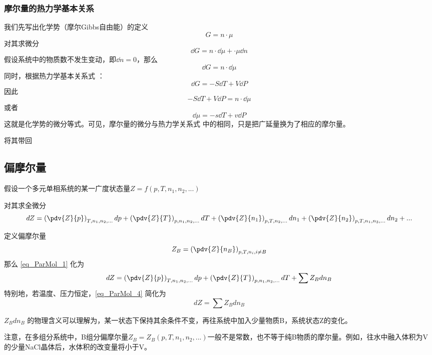 \subsubsection{摩尔量的热力学基本关系}
我们先写出化学势（摩尔Gibbs自由能）的定义
$$G = n \cdot \mu$$
对其求微分
\begin{equation}
\dd G = n \cdot \dd \mu + \cdot \mu \dd n
\end{equation}
假设系统中的物质数不发生变动，即$\dd n = 0$，那么
$$\dd G = n \cdot \dd \mu$$
同时，根据热力学基本关系式 ：
$$\dd G = -S \dd T + V \dd P$$
因此
$$-S \dd T + V \dd P = n \cdot \dd \mu$$
或者
\begin{equation}
\dd \mu = -s \dd T + v \dd P
\end{equation}
这就是化学势的微分等式。可见，摩尔量的微分与热力学关系式 中的相同，只是把广延量换为了相应的摩尔量。

将其带回

\subsection{偏摩尔量}
假设一个多元单相系统的某一广度状态量$Z=f(p,T,n_1,n_2,...)$

对其求全微分
\begin{equation}\label{eq_ParMol_1}
dZ = \left(\pdv{Z}{p}\right)_{T,n_1,n_2,...}dp + \left(\pdv{Z}{T}\right)_{p,n_1,n_2,...}dT+\left(\pdv{Z}{n_1}\right)_{p,T,n_2,...}dn_1+\left(\pdv{Z}{n_2}\right)_{p,T,n_1,n_3,...}dn_2+...
\end{equation}

定义偏摩尔量
\begin{equation}
{Z_B} = \left(\pdv{Z}{n_B}\right)_{p,T,n_i, i \neq B} 
\end{equation}
那么 \autoref{eq_ParMol_1} 化为 
\begin{equation}\label{eq_ParMol_4}
dZ = \left(\pdv{Z}{p}\right)_{T,n_1,n_2,...}dp + \left(\pdv{Z}{T}\right)_{p,n_1,n_2,...}dT+\sum {Z_B} dn_B
\end{equation}
特别地，若温度、压力恒定，\autoref{eq_ParMol_4} 简化为
\begin{equation}\label{eq_ParMol_3}
dZ = \sum {Z_B} dn_B
\end{equation}

${Z_B} d n_B$ 的物理含义可以理解为，某一状态下保持其余条件不变，再往系统中加入少量物质B，系统状态Z的变化。

注意，在多组分系统中，B组分偏摩尔量${Z_B}={Z_B}(p,T,n_1,n_2,...)$一般不是常数，也不等于纯B物质的摩尔量。例如，往水中融入体积为V的少量NaCl晶体后，水体积的改变量将小于V。

